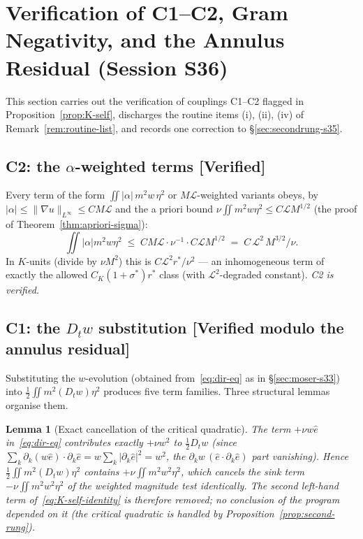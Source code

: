 \documentclass[11pt]{article}
\newtheorem{lemma}[theorem]{Lemma}
\theoremstyle{definition}
\theoremstyle{remark}
\begin{document}
\section{Verification of C1--C2, Gram Negativity, and the Annulus Residual (Session S36)}
\label{sec:verification-s36}

This section carries out the verification of couplings C1--C2 flagged in
Proposition~\ref{prop:K-self}, discharges the routine items (i), (ii), (iv)
of Remark~\ref{rem:routine-list}, and records one correction to \S\ref{sec:secondrung-s35}.

\subsection{C2: the $\alpha$-weighted terms [Verified]}

Every term of the form $\iint |\alpha|\,m^2 w\,\eta^2$ or
$M\mathcal{L}$-weighted variants obeys, by
$|\alpha|\leq\|\nabla u\|_{L^\infty}\leq CM\mathcal{L}$ and the a priori
bound $\nu\iint m^2w\eta^2 \leq C\mathcal{L}M^{1/2}$ (the proof of
Theorem~\ref{thm:apriori-sigma}):
\[
  \iint|\alpha|m^2w\eta^2 \;\leq\; CM\mathcal{L}\cdot\nu^{-1}\cdot
  C\mathcal{L}M^{1/2} \;=\; C\,\mathcal{L}^2\,M^{3/2}/\nu .
\]
In $K$-units (divide by $\nu M^2$) this is $C\mathcal{L}^2 r^*/\nu^2$ ---
an inhomogeneous term of exactly the allowed
$C_K(1+\sigma^*)r^*$ class (with $\mathcal{L}^2$-degraded constant).
\emph{C2 is verified.}

\subsection{C1: the $D_t w$ substitution [Verified modulo the annulus residual]}

Substituting the $w$-evolution (obtained from~\eqref{eq:dir-eq} as in
\S\ref{sec:moser-s33}) into $\tfrac12\iint m^2(D_tw)\eta^2$ produces five
term families. Three structural lemmas organise them.

\begin{lemma}[Exact cancellation of the critical quadratic]\label{lem:w2-cancel}
  The term $+\nu w\hat{e}$ in~\eqref{eq:dir-eq} contributes exactly
  $+\nu w^2$ to $\tfrac12 D_t w$ (since
  $\sum_k \partial_k(w\hat{e})\cdot\partial_k\hat{e}
  = w\sum_k|\partial_k\hat{e}|^2 = w^2$, the $\partial_k w\,
  (\hat{e}\cdot\partial_k\hat{e})$ part vanishing). Hence
  $\tfrac12\iint m^2(D_tw)\eta^2$ contains $+\nu\iint m^2w^2\eta^2$, which
  cancels the sink term $-\nu\iint m^2w^2\eta^2$ of the weighted magnitude
  test identically. The second left-hand term
  of~\eqref{eq:K-self-identity} is therefore removed; no conclusion of the
  program depended on it (the critical quadratic is handled by
  Proposition~\ref{prop:second-rung}).
\end{lemma}
\end{document}
